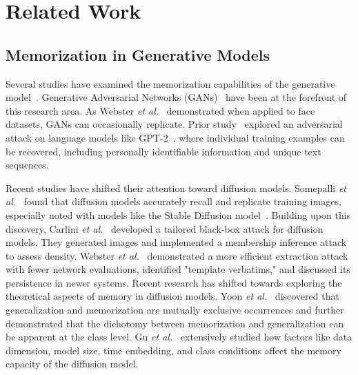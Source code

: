 \section{Related Work}

\subsection{Memorization in Generative Models}
Several studies have examined the memorization capabilities of the generative model~\cite{wang2024replication,sun2024create}. 
Generative Adversarial Networks (GANs)~\cite{goodfellow2020generative} have been at the forefront of this research area. 
As Webster \MakeLowercase{\textit{et al.}}~\cite{webster2021person} demonstrated when applied to face datasets, GANs can occasionally replicate.
Prior study~\cite{carlini2021extracting} explored an adversarial attack on language models like GPT-2~\cite{radford2019language}, where individual training examples can be recovered, including personally identifiable information and unique text sequences.

Recent studies have shifted their attention toward diffusion models. 
Somepalli \MakeLowercase{\textit{et al.}}~\cite{somepalli2023diffusion} found that diffusion models accurately recall and replicate training images, especially noted with models like the Stable Diffusion model~\cite{rombach2022high}.
Building upon this discovery, Carlini \MakeLowercase{\textit{et al.}}~\cite{carlini2023extracting} developed a tailored black-box attack for diffusion models. They generated images and implemented a membership inference attack to assess density.
Webster \MakeLowercase{\textit{et al.}}~\cite{webster2023reproducible} demonstrated a more efficient extraction attack with fewer network evaluations, identified "template verbatims," and discussed its persistence in newer systems. 
Recent research has shifted towards exploring the theoretical aspects of memory in diffusion models.
Yoon \MakeLowercase{\textit{et al.}}~\cite{yoon2023diffusion} discovered that generalization and memorization are mutually exclusive occurrences and further demonstrated that the dichotomy between memorization and generalization can be apparent at the class level.
Gu \MakeLowercase{\textit{et al.}}~\cite{gu2023memorization} extensively studied how factors like data dimension, model size, time embedding, and class conditions affect the memory capacity of the diffusion model.

